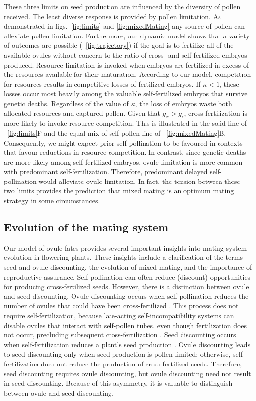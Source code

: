 \documentclass[letterpaper,titlepage]{scrartcl}
\begin{document}
These three limits on seed production are influenced by the diversity
of pollen received. The least diverse response is provided by pollen
limitation. As demonstrated in figs.~\ref{fig:limits} and
\ref{fig:mixedMating} any source of pollen can alleviate pollen
limitation. Furthermore, our dynamic model shows that a variety of
outcomes are possible ({\fref}~\ref{fig:trajectory}) if the goal is to
fertilize all of the available ovules without concern to the ratio of
cross- and self-fertilized embryos produced. Resource limitation is
invoked when embryos are fertilized in excess of the resources
available for their maturation. According to our model, competition
for resources results in competitive losses of fertilized embryos. If
$\kappa<1$, these losses occur most heavily among the valuable
self-fertilized embryos that survive genetic deaths. Regardless of the
value of $\kappa$, the loss of embryos waste both allocated resources
and captured pollen. Given that $g_{x}>g_{s}$, cross-fertilization is
more likely to invoke resource competition. This is illustrated in the
solid line of {\fref}~\ref{fig:limits}F and the equal mix of
self-pollen line of {\fref}~\ref{fig:mixedMating}B. Consequently, we
might expect prior self-pollination to be favoured in contexts that
favour reductions in resource competition. In contrast, since genetic
deaths are more likely among self-fertilized embryos, ovule limitation
is more common with predominant self-fertilization. Therefore,
predominant delayed self-pollination would alleviate ovule
limitation. In fact, the tension between these two limits provides the
prediction that mixed mating is an optimum mating strategy in some
circumstances.

\subsection{Evolution of the mating system}
Our model of ovule fates provides several important insights into
mating system evolution in flowering plants. These insights include a
clarification of the terms seed and ovule discounting, the evolution
of mixed mating, and the importance of reproductive assurance.
Self-pollination can often reduce (discount) opportunities for
producing cross-fertilized seeds. However, there is a distinction
between ovule and seed discounting. Ovule discounting occurs when
self-pollination reduces the number of ovules that could have been
cross-fertilized \citep{Barrett02}. This process does not require
self-fertilization, because late-acting self-incompatibility systems
can disable ovules that interact with self-pollen tubes, even though
fertilization does not occur, precluding subsequent
cross-fertilization \citetext{reviewed by \citealp{Barrett02}}. Seed
discounting occurs when self-fertilization reduces a plant's seed
production \citep{Lloyd92a,Herlihy02}. Ovule discounting leads to seed
discounting only when seed production is pollen limited; otherwise,
self-fertilization does not reduce the production of cross-fertilized
seeds. Therefore, seed discounting requires ovule discounting, but
ovule discounting need not result in seed discounting. Because of this
asymmetry, it is valuable to distinguish between ovule and seed
discounting.
\end{document}
